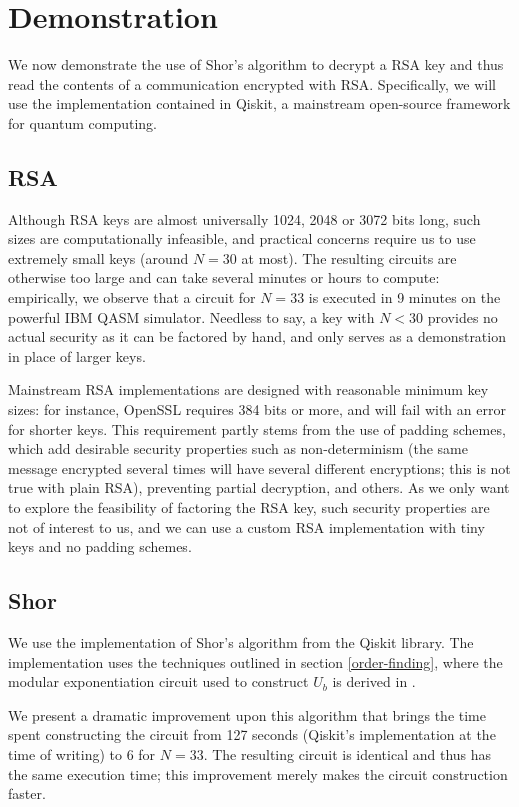 \documentclass[conference]{IEEEtran}
\begin{document}
\section{Demonstration}
We now demonstrate the use of Shor's algorithm to decrypt a RSA key and thus read the contents of a communication encrypted with RSA. Specifically, we will use the implementation contained in Qiskit, a mainstream open-source framework for quantum computing.

\subsection{RSA}
Although RSA keys are almost universally 1024, 2048 or 3072 bits long, such sizes are computationally infeasible, and practical concerns require us to use extremely small keys (around $N=30$ at most). The resulting circuits are otherwise too large and can take several minutes or hours to compute: empirically, we observe that a circuit for $N=33$ is executed in 9 minutes on the powerful IBM QASM simulator. Needless to say, a key with $N<30$ provides no actual security as it can be factored by hand, and only serves as a demonstration in place of larger keys.

Mainstream RSA implementations are designed with reasonable minimum key sizes: for instance, OpenSSL requires 384 bits or more, and will fail with an error for shorter keys. This requirement partly stems from the use of padding schemes, which add desirable security properties such as non-determinism (the same message encrypted several times will have several different encryptions; this is not true with plain RSA), preventing partial decryption, and others. As we only want to explore the feasibility of factoring the RSA key, such security properties are not of interest to us, and we can use a custom RSA implementation with tiny keys and no padding schemes.

\subsection{Shor}
We use the implementation of Shor's algorithm from the Qiskit library. The implementation uses the techniques outlined in section \ref{order-finding}, where the modular exponentiation circuit used to construct $U_b$ is derived in \cite{vbe}.

We present a dramatic improvement upon this algorithm that brings the time spent constructing the circuit from 127 seconds (Qiskit's implementation at the time of writing) to 6 for $N=33$. The resulting circuit is identical and thus has the same execution time; this improvement merely makes the circuit construction faster.
\end{document}
